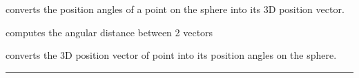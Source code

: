 \begin{related}
  \begin{sulist}{} %
  \item[\htmlref{ang2vec}{sub:ang2vec}] converts the position angles of a point on the sphere 
into its 3D position vector.
  \item[\htmlref{angdist}{sub:angdist}] computes the angular distance between 2 vectors
  \item[\htmlref{vec2ang}{sub:vec2ang}] converts the 3D position vector of point into its position
  angles on the sphere.
  \end{sulist}
\end{related}

\rule{\hsize}{2mm}

\newpage
